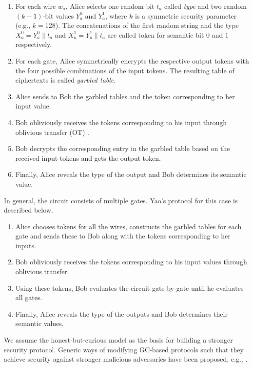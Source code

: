 \begin{enumerate}
\item
	For each wire $w_a$, Alice selects one random bit $t_a$ called \emph{type} and two random $(k-1)$-bit values $Y_a^{0}$ and $Y_a^{1}$, where $k$ is a symmetric security parameter (e.g., $k=128$).
	The concatenations of the first random string and the type $X_a^{0} =  Y_a^{0}\parallel t_a$ and $X_a^{1} =  Y_a^{1}\parallel \bar{t}_a$ are called token for semantic bit $0$ and $1$ respectively.

\item
	For each gate, Alice symmetrically encrypts the respective output tokens with the four possible combinations of the input tokens.
	The resulting table of ciphertexts is called \emph{garbled table}.

\item
	Alice sends to Bob the garbled tables and the token corresponding to her input value.

\item
	Bob obliviously receives the tokens corresponding to his input through oblivious transfer (OT) \cite{rabin2005exchange}.

\item
	Bob decrypts the corresponding entry in the garbled table based on the received input tokens and gets the output token.

\item
	Finally, Alice reveals the type of the output and Bob determines its semantic value.
\end{enumerate}

In general, the circuit consists of multiple gates.
Yao's protocol for this case is described below.

\begin{enumerate}
\item
	Alice chooses tokens for all the wires, constructs the garbled tables for each gate and sends these to Bob along with the tokens corresponding to her inputs.
\item
	Bob obliviously receives the tokens corresponding to his input values through oblivious transfer.
\item
	Using these tokens, Bob evaluates the circuit gate-by-gate until he evaluates all gates.
\item
	Finally, Alice reveals the type of the outputs and Bob determines their semantic values.
\end{enumerate}

We assume the honest-but-curious model as the basis for building a stronger security protocol.
Generic ways of modifying GC-based protocols such that they achieve security against stronger malicious adversaries have been proposed, e.g., \cite{lindell2007efficient, lindell2012secure}.

